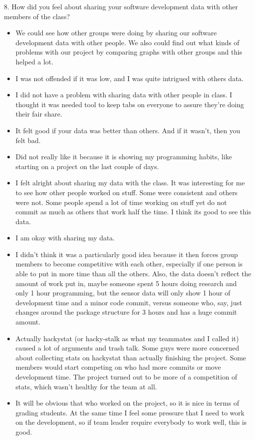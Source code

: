 8. How did you feel about sharing your software development 
data with other members of the class? 
\begin{itemize}
\item We could see how other groups were doing by sharing our software development data with other people. We also could find out what kinds of problems with our project by comparing graphs with other groups and this helped a lot. 
\item I was not offended if it was low, and I was quite intrigued with others data.  
\item I did not have a problem with sharing data with other people in class.  I thought it was needed tool to keep tabs on everyone to assure they're doing their fair share.
\item It felt good if your data was better than others.  And if it wasn't, then you felt bad.
\item Did not really like it because it is showing my programming habits, like starting on a project on the last couple of days.
\item I felt alright about sharing my data with the class. It was interesting for me to see how other people worked on stuff. Some were consistent and others were not. Some people spend a lot of time working on stuff yet do not commit as much as others that work half the time. I think its good to see this data.
\item I am okay with sharing my data.  
\item I didn't think it was a particularly good idea because it then forces group members to become competitive with each other, especially if one person is able to put in more time than all the others. Also, the data doesn't reflect the amount of work put in, maybe someone spent 5 hours doing research and only 1 hour programming, but the sensor data will only show 1 hour of development time and a minor code commit, versus someone who, say, just changes around the package structure for 3 hours and has a huge commit amount.
\item Actually hackystat (or hacky-stalk as what my teammates and I called it) caused a lot of arguments and trash talk.  Some guys were more concerned about collecting stats on hackystat than actually finishing the project.  Some members would start competing on who had more commits or move development time.  The project turned out to be more of a competition of stats, which wasn't healthy for the team at all.
\item It will be obvious that who worked on the project, so it is nice in terms of grading students. At the same time I feel some pressure that I need to work on the development, so if team leader require everybody to work well, this is good.

\end{itemize}
